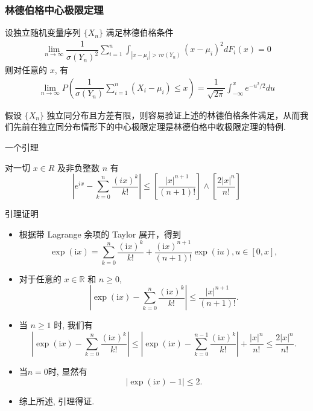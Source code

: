 \documentclass[Prob-All.tex]{subfiles}
\begin{document}
\begin{frame}
	\frametitle{林德伯格中心极限定理}
	\begin{thm}
		设独立随机变量序列 $\{X_n\}$ 满足林德伯格条件
		\begin{eqnarray}\label{eq:Lindeberg}
			\lim_{n\rightarrow\infty} \dfrac{1}{\sigma(Y_n)^2}\sum_{i=1}^n\int_{|x-\mu_i|>\tau\sigma(Y_n)}(x-\mu_i)^2dF_i(x)=0
		\end{eqnarray} 则对任意的 $x$, 有
		\begin{eqnarray*}
			\lim_{n\rightarrow\infty}P(\dfrac{1}{\sigma(Y_n)}\sum_{i=1}^n(X_i-\mu_i)\le x)=\dfrac{1}{\sqrt{2\pi}}\int_{-\infty}^xe^{-u^2/2}du
		\end{eqnarray*}
	\end{thm}
	\pause
	\begin{rmk}
		假设 $\{X_n\}$ 独立同分布且方差有限，则容易验证上述的林德伯格条件满足，从而我们先前在独立同分布情形下的中心极限定理是林德伯格中收极限定理的特例.
	\end{rmk}
\end{frame}

\begin{frame}{一个引理}
	\begin{lem}\label{lem:eixtaylor}
		对一切 $x \in R$ 及非负整数 $n$ 有
		\[
		\left|e^{i x}-\sum_{k=0}^{n} \frac{(i x)^{k}}{k!}\right| \leq\left[\frac{|x|^{n+1}}{(n+1)!}\right] \wedge\left[\frac{2|x|^{n}}{n!}\right]
		\]
	\end{lem}

\end{frame}

\begin{frame}{引理证明}
\begin{itemize}[<+-|alert@+>]
\item 根据带 Lagrange 余项的 Taylor 展开，得到
\[
\exp (\mathrm{i} x)=\sum_{k=0}^{n} \frac{(\mathrm{i} x)^{k}}{k!}+\frac{(\mathrm{i} x)^{n+1}}{(n+1)!} \exp (\mathrm{i} u),  u \in[0, x],
\]

\item 对于任意的 $x \in \mathbb{R}$ 和 $n \ge 0$,
\[
\left|\exp (\mathrm{i} x)-\sum_{k=0}^{n} \frac{(\mathrm{i} x)^{k}}{k!}\right| \leqslant \frac{|x|^{n+1}}{(n+1)!} .
\]
\item  当 $n \ge 1$ 时, 我们有
$$\left|\exp (\mathrm{i} x)-\sum_{k=0}^{n} \frac{(\mathrm{i} x)^{k}}{k!}\right| \leqslant\left|\exp (\mathrm{i} x)-\sum_{k=0}^{n-1} \frac{(\mathrm{i} x)^{k}}{k!}\right|+\frac{|x|^{n}}{n!} \leqslant \frac{2|x|^{n}}{n!} .$$
\item 当$n=0$时, 显然有
$$\left|\exp (\mathrm{i} x)-1\right| \le 2 .$$
\item 综上所述, 引理得证.
\end{itemize}

\end{frame}
\end{document}
